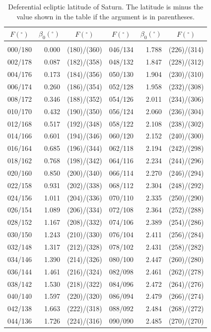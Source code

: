 \clearpage
\begin{table}[!h]\centering
\vspace{0.25cm}
{ \begin{tabular}{crc|crc}
$F (^\circ)$ & $\beta_0(^\circ)$ & $F (^\circ)$ &$F (^\circ)$ & $\beta_0(^\circ)$ & $F (^\circ)$ \\\hline
&&\\[-1.75ex]
000/180 &  0.000 & (180)/(360)&046/134 &  1.788 & (226)/(314)\\
002/178 &  0.087 & (182)/(358)&048/132 &  1.847 & (228)/(312)\\
004/176 &  0.173 & (184)/(356)&050/130 &  1.904 & (230)/(310)\\
006/174 &  0.260 & (186)/(354)&052/128 &  1.958 & (232)/(308)\\
008/172 &  0.346 & (188)/(352)&054/126 &  2.011 & (234)/(306)\\
010/170 &  0.432 & (190)/(350)&056/124 &  2.060 & (236)/(304)\\
012/168 &  0.517 & (192)/(348)&058/122 &  2.108 & (238)/(302)\\
014/166 &  0.601 & (194)/(346)&060/120 &  2.152 & (240)/(300)\\
016/164 &  0.685 & (196)/(344)&062/118 &  2.194 & (242)/(298)\\
018/162 &  0.768 & (198)/(342)&064/116 &  2.234 & (244)/(296)\\
020/160 &  0.850 & (200)/(340)&066/114 &  2.270 & (246)/(294)\\
022/158 &  0.931 & (202)/(338)&068/112 &  2.304 & (248)/(292)\\
024/156 &  1.011 & (204)/(336)&070/110 &  2.335 & (250)/(290)\\
026/154 &  1.089 & (206)/(334)&072/108 &  2.364 & (252)/(288)\\
028/152 &  1.167 & (208)/(332)&074/106 &  2.389 & (254)/(286)\\
030/150 &  1.243 & (210)/(330)&076/104 &  2.411 & (256)/(284)\\
032/148 &  1.317 & (212)/(328)&078/102 &  2.431 & (258)/(282)\\
034/146 &  1.390 & (214)/(326)&080/100 &  2.447 & (260)/(280)\\
036/144 &  1.461 & (216)/(324)&082/098 &  2.461 & (262)/(278)\\
038/142 &  1.530 & (218)/(322)&084/096 &  2.472 & (264)/(276)\\
040/140 &  1.597 & (220)/(320)&086/094 &  2.479 & (266)/(274)\\
042/138 &  1.663 & (222)/(318)&088/092 &  2.484 & (268)/(272)\\
044/136 &  1.726 & (224)/(316)&090/090 &  2.485 & (270)/(270)\\
\end{tabular}}
\caption{Deferential ecliptic latitude of Saturn.  The latitude is minus the value shown
in the table if the argument is
in parentheses. }\label{tlat1s}
\end{table}

